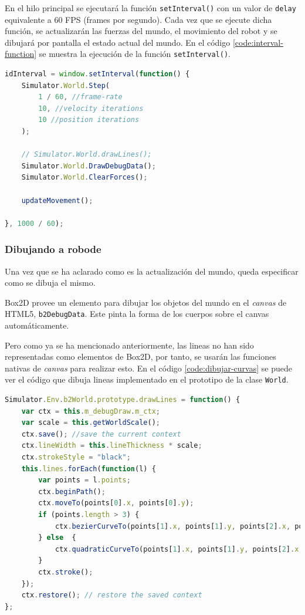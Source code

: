 En el hilo principal se ejecutará la función \texttt{setInterval()} con un valor de \texttt{delay} equivalente a 60 FPS (frames por segundo). Cada vez que se ejecute dicha función, se actualizarán las fuerzas del mundo, el movimiento del robot y se dibujará por pantalla el estado actual del mundo. En el código \ref{code:interval-function} se muestra la ejecución de la función \texttt{setInterval()}.

\begin{lstlisting}[language={Javascript},label={code:interval-function}, caption={Función \texttt{setInterval()} que se ejecutara 60 veces por segundo.}]
idInterval = window.setInterval(function() {
    Simulator.World.Step(
        1 / 60, //frame-rate
        10, //velocity iterations
        10 //position iterations
    );

    // Simulator.World.drawLines();
    Simulator.World.DrawDebugData();
    Simulator.World.ClearForces();

    updateMovement();

}, 1000 / 60);
\end{lstlisting}


\subsubsection{Dibujando a robode}

Una vez que se ha aclarado como es la actualización del mundo, queda especificar como se dibuja el mismo.

Box2D provee un elemento para dibujar los objetos del mundo en el \emph{canvas} de HTML5, \texttt{b2DebugData}. Este pinta la forma de los cuerpos sobre el canvas automáticamente. 

Pero como ya se ha mencionado anteriormente, las lineas no han sido representadas como elementos de Box2D, por tanto, se usarán las funciones nativas de \emph{canvas} para realizar esto. En el código \ref{code:dibujar-curvas} se puede ver el código que dibuja lineas implementado en el prototipo de la clase \texttt{World}.

\begin{lstlisting}[language={Javascript},label={code:dibujar-curvas}, caption={Función que dibuja las curvas de bezier en el \emph{canvas}.}]
Simulator.Env.b2World.prototype.drawLines = function() {
	var ctx = this.m_debugDraw.m_ctx;
	var scale = this.getWorldScale();
	ctx.save(); //save the current context
	ctx.lineWidth = this.lineThickness * scale;
	ctx.strokeStyle = "black";
	this.lines.forEach(function(l) {
		var points = l.points;
		ctx.beginPath();
		ctx.moveTo(points[0].x, points[0].y);
		if (points.length > 3) {
			ctx.bezierCurveTo(points[1].x, points[1].y, points[2].x, points[2].y, points[3].x, points[3].y);
		} else  {
			ctx.quadraticCurveTo(points[1].x, points[1].y, points[2].x, points[2].y);
		}
		ctx.stroke();
	});
	ctx.restore(); // restore the saved context
};
\end{lstlisting}

